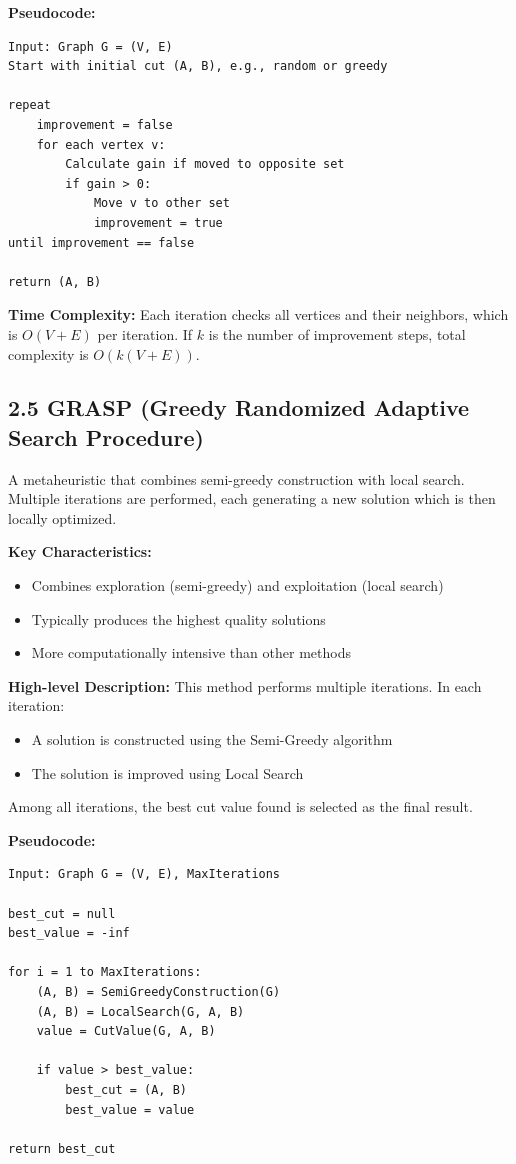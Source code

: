 \documentclass[11pt]{article}
\begin{document}
\textbf{Pseudocode:}
\begin{verbatim}
Input: Graph G = (V, E)
Start with initial cut (A, B), e.g., random or greedy

repeat
    improvement = false
    for each vertex v:
        Calculate gain if moved to opposite set
        if gain > 0:
            Move v to other set
            improvement = true
until improvement == false

return (A, B)
\end{verbatim}

\textbf{Time Complexity:} Each iteration checks all vertices and their neighbors, which is $O(V+E)$ per iteration. If $k$ is the number of improvement steps, total complexity is $O(k(V+E))$.

\subsection*{2.5 GRASP (Greedy Randomized Adaptive Search Procedure)}
A metaheuristic that combines semi-greedy construction with local search. Multiple iterations are performed, each generating a new solution which is then locally optimized.

\textbf{Key Characteristics:}
\begin{itemize}
\item Combines exploration (semi-greedy) and exploitation (local search)
\item Typically produces the highest quality solutions
\item More computationally intensive than other methods
\end{itemize}

\textbf{High-level Description:}
This method performs multiple iterations. In each iteration:
\begin{itemize}
    \item A solution is constructed using the Semi-Greedy algorithm
    \item The solution is improved using Local Search
\end{itemize}
Among all iterations, the best cut value found is selected as the final result.

\textbf{Pseudocode:}
\begin{verbatim}
Input: Graph G = (V, E), MaxIterations

best_cut = null
best_value = -inf

for i = 1 to MaxIterations:
    (A, B) = SemiGreedyConstruction(G)
    (A, B) = LocalSearch(G, A, B)
    value = CutValue(G, A, B)

    if value > best_value:
        best_cut = (A, B)
        best_value = value

return best_cut
\end{verbatim}
\end{document}
